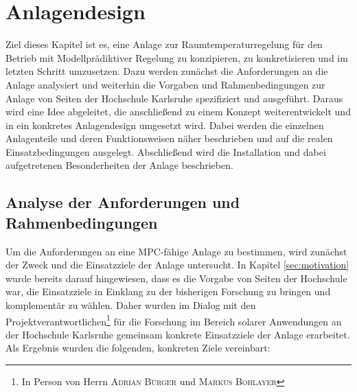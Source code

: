 %
%

\renewcommand{\chapterheadstartvskip}{\vspace*{2cm}}

\chapter{Anlagendesign}
\label{chap:anlagendesign}

\renewcommand{\chapterheadstartvskip}{\vspace*{-0.5cm}}

Ziel dieses Kapitel ist es, eine Anlage zur Raumtemperaturregelung für den Betrieb mit Modellprädiktiver Regelung zu konzipieren, zu konkretisieren und im letzten Schritt umzusetzen. Dazu werden zunächst die Anforderungen an die Anlage analysiert und weiterhin die Vorgaben und Rahmenbedingungen zur Anlage von Seiten der Hochschule Karlsruhe spezifiziert und ausgeführt. Daraus wird eine Idee abgeleitet, die anschließend zu einem Konzept weiterentwickelt und in ein konkretes Anlagendesign umgesetzt wird. Dabei werden die einzelnen Anlagenteile und deren Funktionsweisen näher beschrieben und auf die realen Einsatzbedingungen ausgelegt. Abschließend wird die Installation und dabei aufgetretenen Besonderheiten der Anlage beschrieben.

\section{Analyse der Anforderungen und Rahmenbedingungen}
\label{sec:anforderungen}

Um die Anforderungen an eine MPC-fähige Anlage zu bestimmen, wird zunächst der Zweck und die Einsatzziele der Anlage untersucht. In Kapitel \ref{sec:motivation} wurde bereits darauf hingewiesen, dass es die Vorgabe von Seiten der Hochschule war, die Einsatzziele in Einklang zu der bisherigen Forschung zu bringen und komplementär zu wählen. Daher wurden im Dialog mit den Projektverantwortlichen\footnote{In Person von Herrn \textsc{Adrian Bürger} und \textsc{Markus Bohlayer}} für die Forschung im Bereich solarer Anwendungen an der Hochschule Karlsruhe gemeinsam konkrete Einsatzziele der Anlage erarbeitet. Als Ergebnis wurden die folgenden, konkreten Ziele vereinbart:
 
